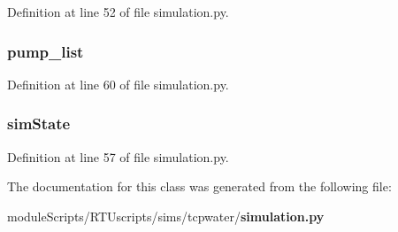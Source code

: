 Definition at line 52 of file simulation.\+py.

\subsubsection[{pump\+\_\+list}]{\setlength{\rightskip}{0pt plus 5cm}pump\+\_\+list}\label{classsims_1_1tcpwater_1_1simulation_1_1_simulation_aea375cf588bb6fd06df93af152cdc0d5}


Definition at line 60 of file simulation.\+py.

\subsubsection[{sim\+State}]{\setlength{\rightskip}{0pt plus 5cm}sim\+State}\label{classsims_1_1tcpwater_1_1simulation_1_1_simulation_a41f89dc1173ec57bbed0975711b48c36}


Definition at line 57 of file simulation.\+py.



The documentation for this class was generated from the following file\+:\begin{DoxyCompactItemize}
\item 
module\+Scripts/\+R\+T\+Uscripts/sims/tcpwater/{\bf simulation.\+py}\end{DoxyCompactItemize}
